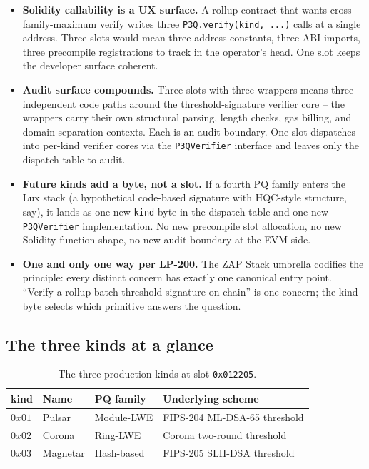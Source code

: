 \begin{itemize}[leftmargin=2em,nosep]
\item \textbf{Solidity callability is a UX surface.} A rollup
  contract that wants cross-family-maximum verify writes three
  \texttt{P3Q.verify(kind, ...)} calls at a single address. Three
  slots would mean three address constants, three ABI imports,
  three precompile registrations to track in the operator's head.
  One slot keeps the developer surface coherent.
\item \textbf{Audit surface compounds.} Three slots with three
  wrappers means three independent code paths around the
  threshold-signature verifier core -- the wrappers carry their
  own structural parsing, length checks, gas billing, and
  domain-separation contexts. Each is an audit boundary. One
  slot dispatches into per-kind verifier cores via the
  \texttt{P3QVerifier} interface and leaves only the dispatch
  table to audit.
\item \textbf{Future kinds add a byte, not a slot.} If a fourth
  PQ family enters the Lux stack (a hypothetical code-based
  signature with HQC-style structure, say), it lands as one new
  \texttt{kind} byte in the dispatch table and one new
  \texttt{P3QVerifier} implementation. No new precompile slot
  allocation, no new Solidity function shape, no new audit
  boundary at the EVM-side.
\item \textbf{One and only one way per LP-200.} The ZAP Stack
  umbrella codifies the principle: every distinct concern has
  exactly one canonical entry point. ``Verify a rollup-batch
  threshold signature on-chain'' is one concern; the kind byte
  selects which primitive answers the question.
\end{itemize}

\subsection{The three kinds at a glance}

\begin{table}[h]
\centering
\small
\begin{tabular}{@{}llll@{}}
\toprule
\textbf{kind} & \textbf{Name} & \textbf{PQ family} & \textbf{Underlying scheme} \\
\midrule
$0x01$ & Pulsar   & Module-LWE   & FIPS-204 ML-DSA-65 threshold \\
$0x02$ & Corona   & Ring-LWE     & Corona two-round threshold \\
$0x03$ & Magnetar & Hash-based   & FIPS-205 SLH-DSA threshold \\
\bottomrule
\end{tabular}
\caption{The three production kinds at slot \texttt{0x012205}.}
\label{tab:kinds-overview}
\end{table}

